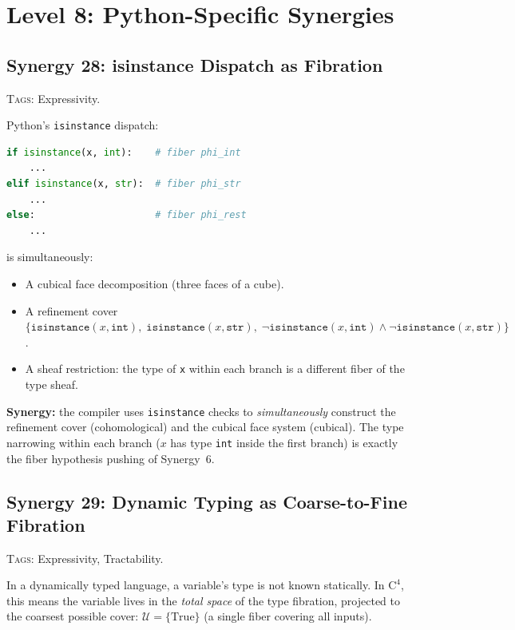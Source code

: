 \documentclass[11pt,a4paper]{article}
\theoremstyle{definition}
\theoremstyle{plain}
\newcommand{\covers}{\mathcal{U}}
\begin{document}
\section{Level 8: Python-Specific Synergies}
\label{sec:syn-python}


\subsection{Synergy 28: isinstance Dispatch as Fibration}
\label{sec:syn-isinstance}

\textsc{Tags:} Expressivity.

\medskip\noindent
Python's \texttt{isinstance} dispatch:
\begin{lstlisting}[language=Python]
if isinstance(x, int):    # fiber phi_int
    ...
elif isinstance(x, str):  # fiber phi_str
    ...
else:                     # fiber phi_rest
    ...
\end{lstlisting}
is simultaneously:
\begin{itemize}
\item A cubical face decomposition (three faces of a cube).
\item A refinement cover
  $\{\mathtt{isinstance}(x, \mathtt{int}),\;
  \mathtt{isinstance}(x, \mathtt{str}),\;
  \neg\mathtt{isinstance}(x, \mathtt{int}) \wedge
  \neg\mathtt{isinstance}(x, \mathtt{str})\}$.
\item A sheaf restriction: the type of \texttt{x} within
  each branch is a different fiber of the type sheaf.
\end{itemize}

\textbf{Synergy:} the compiler uses \texttt{isinstance} checks to
\emph{simultaneously} construct the refinement cover (cohomological)
and the cubical face system (cubical).  The type narrowing within
each branch ($x$ has type \texttt{int} inside the first branch)
is exactly the fiber hypothesis pushing of Synergy~6.


\subsection{Synergy 29: Dynamic Typing as Coarse-to-Fine Fibration}
\label{sec:syn-dynamic-typing}

\textsc{Tags:} Expressivity, Tractability.

\medskip\noindent
In a dynamically typed language, a variable's type is not known
statically.  In $\mathrm{C}^4$, this means the variable lives in the
\emph{total space} of the type fibration, projected to the coarsest
possible cover: $\covers = \{\mathrm{True}\}$ (a single fiber covering
all inputs).
\end{document}
